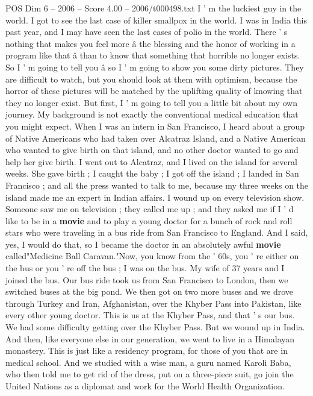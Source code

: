 \begin{textsample}{POS Dim 6 – 2006 – Score 4.00 – 2006/t000498.txt}  \label{ex:f6_pos_009}
I ' m the luckiest guy in the world.
I got to see the last case of killer smallpox in the world.
I was in India this past year, and I may have seen the last cases of polio in the world.
There ' s nothing that makes you feel more â the blessing and the honor of working in a program like that â than to know that something that horrible no longer exists.
So I ' m going to tell you â so I ' m going to show you some dirty pictures.
They are difficult to watch, but you should look at them with optimism, because the horror of these pictures will be matched by the uplifting quality of knowing that they no longer exist.
But first, I ' m going to tell you a little bit about my own journey.
My background is not exactly the conventional medical education that you might expect.
When I was an intern in San Francisco, I heard about a group of Native Americans who had taken over Alcatraz Island, and a Native American who wanted to give birth on that island, and no other doctor wanted to go and help her give birth.
I went out to Alcatraz, and I lived on the island for several weeks.
She gave birth ; I caught the baby ; I got off the island ; I landed in San Francisco ; and all the press wanted to talk to me, because my three weeks on the island made me an expert in Indian affairs.
I wound up on every television show.
Someone saw me on television ; they called me up ; and they asked me if I ' d like to be in a \textbf{movie} and to play a young doctor for a bunch of rock and roll stars who were traveling in a bus ride from San Francisco to England.
And I said, yes, I would do that, so I became the doctor in an absolutely awful \textbf{movie} called"Medicine Ball Caravan."Now, you know from the ' 60s, you ' re either on the bus or you ' re off the bus ; I was on the bus.
My wife of 37 years and I joined the bus.
Our bus ride took us from San Francisco to London, then we switched buses at the big pond.
We then got on two more buses and we drove through Turkey and Iran, Afghanistan, over the Khyber Pass into Pakistan, like every other young doctor.
This is us at the Khyber Pass, and that ' s our bus.
We had some difficulty getting over the Khyber Pass.
But we wound up in India.
And then, like everyone else in our generation, we went to live in a Himalayan monastery.
This is just like a residency program, for those of you that are in medical school.
And we studied with a wise man, a guru named Karoli Baba, who then told me to get rid of the dress, put on a three-piece suit, go join the United Nations as a diplomat and work for the World Health Organization.

\end{textsample}
